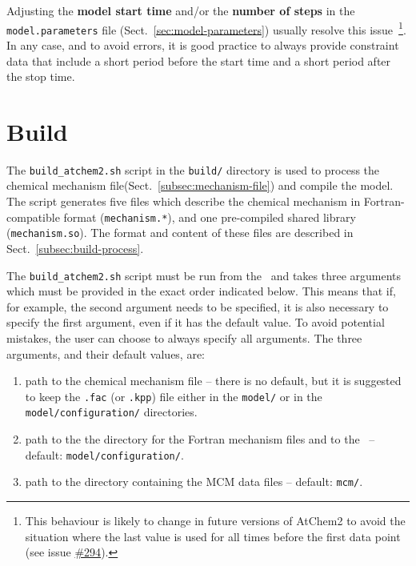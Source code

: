 Adjusting the \textbf{model start time} and/or the \textbf{number of steps}
in the \texttt{model.parameters} file (Sect.~\ref{sec:model-parameters})
usually resolve this issue~\footnote{This behaviour is likely to change
  in future versions of AtChem2 to avoid the situation where
  the last value is used for all times before the first data point
  (see issue \href{https://github.com/AtChem/AtChem2/issues/294}{\#294}).}.
In any case, and to avoid errors, it is good practice to always
provide constraint data that include a short period before the start
time and a short period after the stop time.

\section{Build} \label{sec:build}

The \texttt{build\_atchem2.sh} script in the \texttt{build/} directory is
used to process the chemical mechanism file(Sect.~\ref{subsec:mechanism-file})
and compile the model. The script generates five files which describe
the chemical mechanism in Fortran-compatible format
(\texttt{mechanism.*}), and one pre-compiled shared library
(\texttt{mechanism.so}). The format and content of these files are
described in Sect.~\ref{subsec:build-process}.

The \texttt{build\_atchem2.sh} script must be run from the \maindir\
and takes three arguments which must be provided in the exact order
indicated below. This means that if, for example, the second argument
needs to be specified, it is also necessary to specify the first
argument, even if it has the default value. To avoid potential
mistakes, the user can choose to always specify all arguments. The
three arguments, and their default values, are:

\begin{enumerate}
\item path to the chemical mechanism file -- there is no default, but
  it is suggested to keep the \texttt{.fac} (or \texttt{.kpp}) file
  either in the \texttt{model/} or in the \texttt{model/configuration/}
  directories.
\item path to the the directory for the Fortran mechanism files and to
  the \sharedir\ -- default: \texttt{model/configuration/}.
\item path to the directory containing the MCM data files -- default:
  \texttt{mcm/}.
\end{enumerate}

